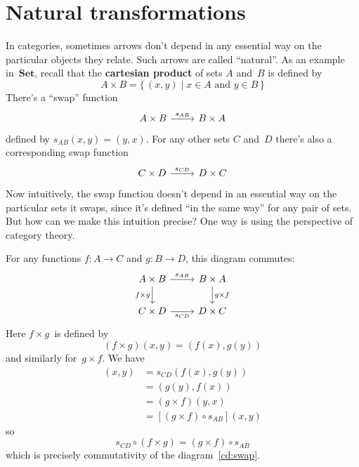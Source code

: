 \documentclass[letterpaper,12pt]{article}
\newcommand{\after}{\circ}
\newcommand{\cat}[1]{\mathbf{#1}}
\newcommand{\Set}{\cat{Set}}
\newcommand{\textdefn}{\textbf}
\theoremstyle{definition}
\theoremstyle{plain}
\numberwithin{equation}{section}
\begin{document}
\section{Natural transformations}
In categories, sometimes arrows don't depend in any essential way on the particular objects they relate. Such arrows are called ``natural''. As an example in~\(\Set\), recall that the \textdefn{cartesian product} of sets \(A\) and~\(B\) is defined by
\begin{equation}
A\times B=\{\,(x,y)\mid x\in A\text{ and }y\in B\,\}
\label{eq:cartesianprod}
\end{equation}
There's a ``swap'' function
\begin{equation*}
\begin{tikzcd}
A\times B \ar[r,"s_{AB}"] & B\times A
\end{tikzcd}
\end{equation*}
defined by \(s_{AB}(x,y)=(y,x)\). For any other sets \(C\) and~\(D\) there's also a corresponding swap function
\begin{equation*}
\begin{tikzcd}
C\times D \ar[r,"s_{CD}"] & D\times C
\end{tikzcd}
\end{equation*}
Now intuitively, the swap function doesn't depend in an essential way on the particular sets it swaps, since it's defined ``in the same way'' for any pair of sets. But how can we make this intuition precise? One way is using the perspective of category theory.

For any functions \(f:A\to C\) and \(g:B\to D\), this diagram commutes:
\begin{equation}
\begin{tikzcd}
A\times B \ar[d, "f\times g"'] \ar[r, "s_{AB}"] & B\times A \ar[d, "g\times f"] \\
C\times D \ar[r, "s_{CD}"'] & D\times C
\end{tikzcd}
\label{cd:swap}
\end{equation}
Here \(f\times g\)~is defined by
\[(f\times g)(x,y)=(f(x),g(y))\]
and similarly for~\(g\times f\). We have
\begin{align*}
[s_{CD}\after(f\times g)](x,y)&=s_{CD}(f(x),g(y))\\
	&=(g(y),f(x))\\
	&=(g\times f)(y,x)\\
	&=[(g\times f)\after s_{AB}](x,y)
\end{align*}
so
\[s_{CD}\after(f\times g)=(g\times f)\after s_{AB}\]
which is precisely commutativity of the diagram~\eqref{cd:swap}.
\end{document}
